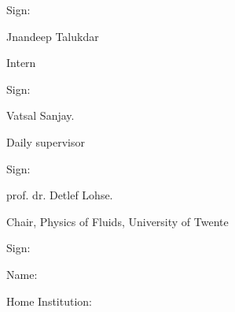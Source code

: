 \documentclass[a4paper,10pt]{article}
\begin{document}
\pagebreak

\vspace{20mm}

\noindent Sign: \hrulefill

\hspace*{0mm}\phantom{Sign: }Jnandeep Talukdar 

\hspace*{0mm}\phantom{Sign: }Intern

\vspace{20mm}

\noindent
Sign: \hrulefill

\hspace*{0mm}\phantom{Sign: }Vatsal Sanjay.

\hspace*{0mm}\phantom{Sign: }Daily supervisor

\vspace{20mm}

\noindent
Sign: \hrulefill

\hspace*{0mm}\phantom{Sign: }prof. dr. Detlef Lohse.

\hspace*{0mm}\phantom{Sign: }Chair, Physics of Fluids, University of Twente

\vspace{20mm}
\noindent
Sign: \hrulefill

\hspace*{0mm}\phantom{Sign: }Name:

\hspace*{0mm}\phantom{Sign: }Home Institution:
\vspace{15mm}



\end{document}
